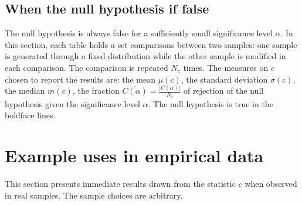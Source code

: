 \documentclass[%
	aip,
	jmp,%
	amsmath,amssymb,
	reprint,%
]{revtex4-1}
\begin{document}






\FloatBarrier
\subsection{When the null hypothesis if false}
The null hypothesis is always false for a sufficiently small
significance level $\alpha$.
In this section,
each table holds a set comparisons between two samples:
one sample is generated through a
fixed distribution while the other
sample is modified in each comparison.
The comparison is repeated $N_c$ times.
The measures on $c$ chosen to report the results are:
the mean $\mu(c)$, the standard deviation $\sigma(c)$,
the median $m(c)$,
the  fraction
$\overline{C(\alpha)}=\frac{|C(\alpha)|}{N_c}$
of rejection of the null hypothesis given the significance level $\alpha$.
The null hypothesis is true in the boldface lines.







%
%



\FloatBarrier
\section{Example uses in empirical data}\label{sec:empirical}

This section presents immediate results
drawn from the statistic $c$ when observed
in real samples.
The sample choices are arbitrary.
\end{document}
